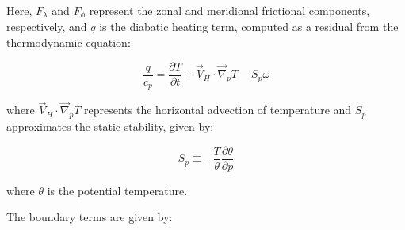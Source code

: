 \documentclass[pdflatex,sn-chicago]{sn-jnl}%
\theoremstyle{plain}
\theoremstyle{definition}
\theoremstyle{remark}
\theoremstyle{definition}
\begin{document}
Here, $F_{\lambda}$ and $F_{\phi}$ represent the zonal and meridional frictional components, respectively, and $q$ is the diabatic heating term, computed as a residual from the thermodynamic equation:

\begin{equation}
    \frac{q}{c_p} = \frac{\partial T}{\partial t} + \Vec{V}_H \cdot \Vec{\nabla}_p T - S_p\omega
\end{equation}

where $\Vec{V}_H \cdot \Vec{\nabla}_p T$ represents the horizontal advection of temperature and $S_p$ approximates the static stability, given by:

\begin{equation}
    S_p \equiv -\frac{T}{\theta}\frac{\partial \theta}{\partial p}
\end{equation}

where $\theta$ is the potential temperature. 


The boundary terms are given by:
\end{document}
